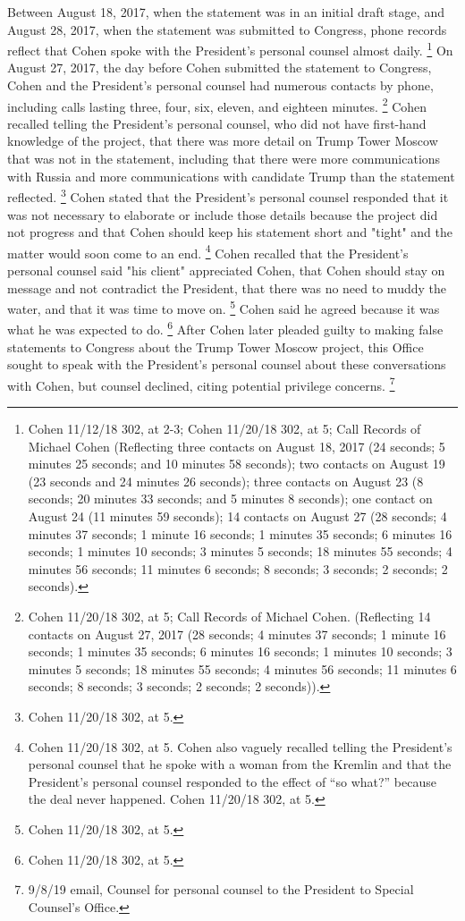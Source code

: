 {Between August 18, 2017, when the statement was in an initial draft stage, and August 28, 2017, when the statement was submitted to Congress, phone records reflect that Cohen spoke with the President's personal counsel almost daily.%
\footnote{Cohen 11/12/18 302, at 2-3;
Cohen 11/20/18 302, at 5;
Call Records of Michael Cohen (Reflecting three contacts on August 18, 2017 (24 seconds;
5 minutes 25 seconds;
and 10 minutes 58 seconds);
two contacts on August 19 (23 seconds and 24 minutes 26 seconds);
three contacts on August 23 (8 seconds; 20 minutes 33 seconds;
and 5 minutes 8 seconds);
one contact on August 24 (11 minutes 59 seconds);
14 contacts on August 27 (28 seconds;
4 minutes 37 seconds;
1 minute 16 seconds;
1 minutes 35 seconds;
6 minutes 16 seconds;
1 minutes 10 seconds;
3 minutes 5 seconds;
18 minutes 55 seconds;
4 minutes 56 seconds;
11 minutes 6 seconds;
8 seconds;
3 seconds;
2 seconds;
2 seconds).}
On August 27, 2017, the day before Cohen submitted the statement to Congress, Cohen and the President's personal counsel had numerous contacts by phone, including calls lasting three, four, six, eleven, and eighteen minutes.%
\footnote{Cohen 11/20/18 302, at 5;
Call Records of Michael Cohen.
(Reflecting 14 contacts on August 27, 2017 (28 seconds;
4 minutes 37 seconds;
1 minute 16 seconds;
1 minutes 35 seconds;
6 minutes 16 seconds;
1 minutes 10 seconds;
3 minutes 5 seconds;
18 minutes 55 seconds;
4 minutes 56 seconds;
11 minutes 6 seconds;
8 seconds;
3 seconds;
2 seconds;
2 seconds)).
}
Cohen recalled telling the President's personal counsel, who did not have first-hand knowledge of the project, that there was more detail on Trump Tower Moscow that was not in the statement, including that there were more communications with Russia and more communications with candidate Trump than the statement reflected.%
\footnote{Cohen 11/20/18 302, at 5.}
Cohen stated that the President's personal counsel responded that it was not necessary to elaborate or include those details because the project did not progress and that Cohen should keep his statement short and "tight" and the matter would soon come to an end.%
\footnote{Cohen 11/20/18 302, at 5.
Cohen also vaguely recalled telling the President’s personal counsel that he spoke with a woman from the Kremlin and that the President’s personal counsel responded to the effect of “so what?” because the deal never happened.
Cohen 11/20/18 302, at 5.}
Cohen recalled that the President's personal counsel said "his client" appreciated Cohen, that Cohen should stay on message and not contradict the President, that there was no need to muddy the water, and that it was time to move on.%
\footnote{Cohen 11/20/18 302, at 5.}
Cohen said he agreed because it was what he was expected to do.%
\footnote{Cohen 11/20/18 302, at 5.}
After Cohen later pleaded guilty to making false statements to Congress about the Trump Tower Moscow project, this Office sought to speak with the President's personal counsel about these conversations with Cohen, but counsel declined, citing potential privilege concerns.%
\footnote{9/8/19 email, Counsel for personal counsel to the President to Special Counsel’s Office.}

}
